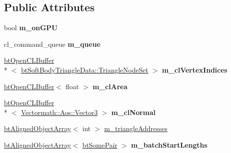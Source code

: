 \subsection*{Public Attributes}
\begin{DoxyCompactItemize}
\item 
\hypertarget{classbt_soft_body_triangle_data_open_c_l_a5e979f70bc19df87c3adec0ef24b7335}{bool {\bfseries m\+\_\+on\+G\+P\+U}}\label{classbt_soft_body_triangle_data_open_c_l_a5e979f70bc19df87c3adec0ef24b7335}

\item 
\hypertarget{classbt_soft_body_triangle_data_open_c_l_abaf3e4b2e9d50aff1ee54ba69b15eef0}{cl\+\_\+command\+\_\+queue {\bfseries m\+\_\+queue}}\label{classbt_soft_body_triangle_data_open_c_l_abaf3e4b2e9d50aff1ee54ba69b15eef0}

\item 
\hypertarget{classbt_soft_body_triangle_data_open_c_l_a2c9e3078664e33cb9c61a863206ffe42}{\hyperlink{classbt_open_c_l_buffer}{bt\+Open\+C\+L\+Buffer}\\*
$<$ \hyperlink{classbt_soft_body_triangle_data_1_1_triangle_node_set}{bt\+Soft\+Body\+Triangle\+Data\+::\+Triangle\+Node\+Set} $>$ {\bfseries m\+\_\+cl\+Vertex\+Indices}}\label{classbt_soft_body_triangle_data_open_c_l_a2c9e3078664e33cb9c61a863206ffe42}

\item 
\hypertarget{classbt_soft_body_triangle_data_open_c_l_a59b707a55d60d7dbdf6df672a44a13ba}{\hyperlink{classbt_open_c_l_buffer}{bt\+Open\+C\+L\+Buffer}$<$ float $>$ {\bfseries m\+\_\+cl\+Area}}\label{classbt_soft_body_triangle_data_open_c_l_a59b707a55d60d7dbdf6df672a44a13ba}

\item 
\hypertarget{classbt_soft_body_triangle_data_open_c_l_a0218cb8b099ca3c962ff6a27706c4ce0}{\hyperlink{classbt_open_c_l_buffer}{bt\+Open\+C\+L\+Buffer}\\*
$<$ \hyperlink{class_vectormath_1_1_aos_1_1_vector3}{Vectormath\+::\+Aos\+::\+Vector3} $>$ {\bfseries m\+\_\+cl\+Normal}}\label{classbt_soft_body_triangle_data_open_c_l_a0218cb8b099ca3c962ff6a27706c4ce0}

\item 
\hyperlink{classbt_aligned_object_array}{bt\+Aligned\+Object\+Array}$<$ int $>$ \hyperlink{classbt_soft_body_triangle_data_open_c_l_a7b0d241380b3cbfbd7c386b354a268fd}{m\+\_\+triangle\+Addresses}
\item 
\hypertarget{classbt_soft_body_triangle_data_open_c_l_ae286924092679bd420f09a99456507ae}{\hyperlink{classbt_aligned_object_array}{bt\+Aligned\+Object\+Array}$<$ \hyperlink{structbt_soft_body_triangle_data_open_c_l_1_1bt_some_pair}{bt\+Some\+Pair} $>$ {\bfseries m\+\_\+batch\+Start\+Lengths}}\label{classbt_soft_body_triangle_data_open_c_l_ae286924092679bd420f09a99456507ae}

\end{DoxyCompactItemize}
